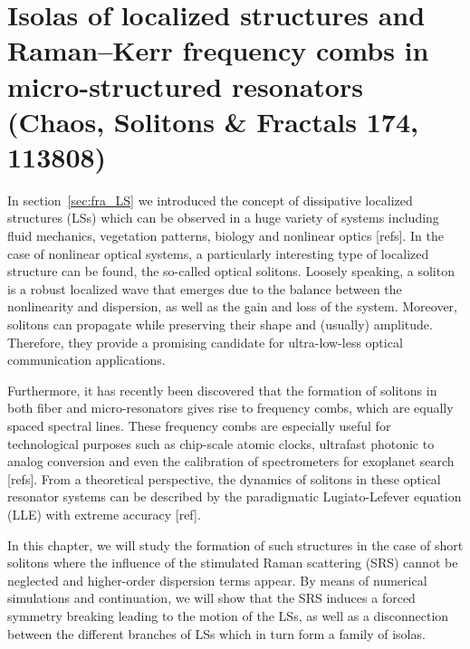 \chapter{Isolas of localized structures and Raman–Kerr frequency combs in micro-structured resonators (Chaos, Solitons \& Fractals 174, 113808)}

In section~\ref{sec:fra_LS} we introduced the concept of dissipative 
localized structures (LSs) which can be observed in a huge variety
of systems including fluid mechanics, vegetation patterns, biology and 
nonlinear optics [refs]. In the case of nonlinear optical systems,
a particularly interesting type of localized structure can be found,
the so-called optical solitons. Loosely speaking, a soliton
is a robust localized wave that emerges due to the balance between the nonlinearity
and dispersion, as well as the gain and loss of the system. Moreover,
solitons can propagate while preserving their shape and (usually) amplitude.
Therefore, they provide a promising candidate for ultra-low-less optical communication
applications.

Furthermore, it has recently been discovered that the formation of solitons
in both fiber and micro-resonators gives rise to frequency combs, which are equally
spaced spectral lines. These frequency combs are especially useful
for technological purposes such as chip-scale atomic clocks, ultrafast 
photonic to analog conversion and even the calibration of spectrometers
for exoplanet search [refs]. From a theoretical perspective, the dynamics
of solitons in these optical resonator systems can be described 
by the paradigmatic Lugiato-Lefever equation (LLE) \cite{lugiatolefever1987}
with extreme accuracy [ref].

In this chapter, we will study the formation of such structures in the
case of short solitons where the influence of the stimulated Raman scattering (SRS)
cannot be neglected and higher-order dispersion terms appear. By means of
numerical simulations and continuation, we will show
that the SRS induces a forced symmetry breaking leading to the motion
of the LSs, as well as a disconnection between the different branches of LSs
which in turn form a family of isolas. 